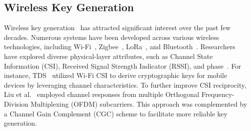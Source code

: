 \subsection{Wireless Key Generation} 

Wireless key generation~\cite{zhang2016key} has attracted significant interest over the past few decades. Numerous systems have been developed across various wireless technologies, including Wi-Fi~\cite{xi2016instant, liu2013fast}, Zigbee~\cite{Aonowireless2005}, LoRa~\cite{zhang2018channel, ruotsalainen2019experimental, xulorakey, jiayaoipsn, yang2022vehicle}, and Bluetooth~\cite{premnath2014secret}. Researchers have explored diverse physical-layer attributes, such as Channel State Information (CSI)\cite{xi2016instant, liu2013fast}, Received Signal Strength Indicator (RSSI)\cite{yang2022vehicle, jiayaoipsn}, and phase~\cite{wang2011fast}.
For instance, TDS~\cite{xi2016instant} utilized Wi-Fi CSI to derive cryptographic keys for mobile devices by leveraging channel characteristics. To further improve CSI reciprocity, Liu et al.~\cite{liu2013fast} employed channel responses from multiple Orthogonal Frequency-Division Multiplexing (OFDM) subcarriers. This approach was complemented by a Channel Gain Complement (CGC) scheme to facilitate more reliable key generation.


